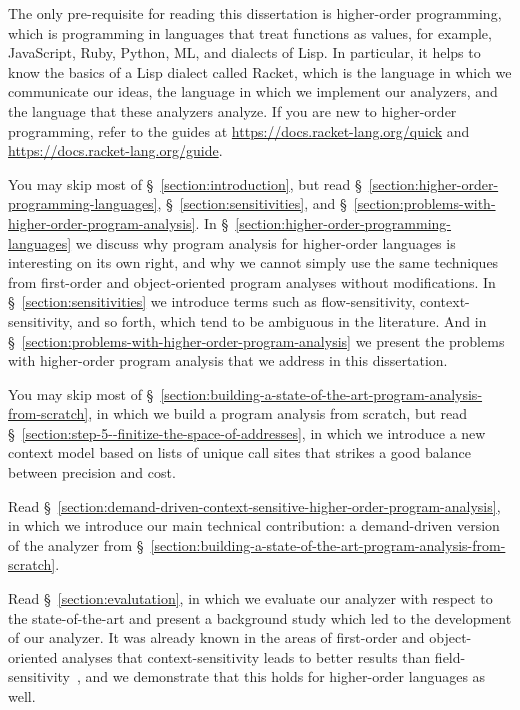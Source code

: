 \documentclass[12pt, oneside]{book}
\begin{document}
The only pre-requisite for reading this dissertation is higher-order programming, which is programming in languages that treat functions as values, for example, JavaScript, Ruby, Python, ML, and dialects of Lisp. In particular, it helps to know the basics of a Lisp dialect called Racket, which is the language in which we communicate our ideas, the language in which we implement our analyzers, and the language that these analyzers analyze. If you are new to higher-order programming, refer to the guides at \url{https://docs.racket-lang.org/quick} and \url{https://docs.racket-lang.org/guide}.

You may skip most of §~\ref{section:introduction}, but read §~\ref{section:higher-order-programming-languages}, §~\ref{section:sensitivities}, and §~\ref{section:problems-with-higher-order-program-analysis}. In §~\ref{section:higher-order-programming-languages} we discuss why program analysis for higher-order languages is interesting on its own right, and why we cannot simply use the same techniques from first-order and object-oriented program analyses without modifications. In §~\ref{section:sensitivities} we introduce terms such as flow-sensitivity, context-sensitivity, and so forth, which tend to be ambiguous in the literature. And in §~\ref{section:problems-with-higher-order-program-analysis} we present the problems with higher-order program analysis that we address in this dissertation.

You may skip most of §~\ref{section:building-a-state-of-the-art-program-analysis-from-scratch}, in which we build a program analysis from scratch, but read §~\ref{section:step-5--finitize-the-space-of-addresses}, in which we introduce a new context model based on lists of unique call sites that strikes a good balance between precision and cost.

Read §~\ref{section:demand-driven-context-sensitive-higher-order-program-analysis}, in which we introduce our main technical contribution: a demand-driven version of the analyzer from §~\ref{section:building-a-state-of-the-art-program-analysis-from-scratch}.

Read §~\ref{section:evalutation}, in which we evaluate our analyzer with respect to the state-of-the-art and present a background study which led to the development of our analyzer. It was already known in the areas of first-order and object-oriented analyses that context-sensitivity leads to better results than field-sensitivity~\cite{lcl}, and we demonstrate that this holds for higher-order languages as well.
\end{document}
